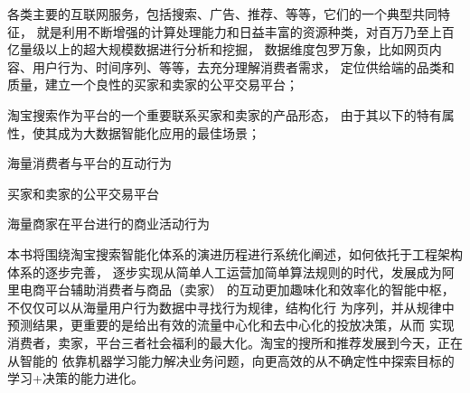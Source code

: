 
 \vspace*{0.0cm}
\thispagestyle{empty}
\vspace*{2.2cm}
\centerline{\hei{\color{darkblue}{内~容~简~介}}}\vspace{2cm}

各类主要的互联网服务，包括搜索、广告、推荐、等等，它们的一个典型共同特征，
就是利用不断增强的计算处理能力和日益丰富的资源种类，对百万乃至上百亿量级以上的超大规模数据进行分析和挖掘，
数据维度包罗万象，比如网页内容、用户行为、时间序列、等等，去充分理解消费者需求，
定位供给端的品类和质量，建立一个良性的买家和卖家的公平交易平台；

淘宝搜索作为平台的一个重要联系买家和卖家的产品形态， 
由于其以下的特有属性，使其成为大数据智能化应用的最佳场景；
\begin{description}
	\item 海量消费者与平台的互动行为
	\item 买家和卖家的公平交易平台
	\item 海量商家在平台进行的商业活动行为
\end{description} 

本书将围绕淘宝搜索智能化体系的演进历程进行系统化阐述，如何依托于工程架构体系的逐步完善，
逐步实现从简单人工运营加简单算法规则的时代，发展成为阿里电商平台辅助消费者与商品（卖家）
的互动更加趣味化和效率化的智能中枢，不仅仅可以从海量用户行为数据中寻找行为规律，结构化行
为序列，并从规律中预测结果，更重要的是给出有效的流量中心化和去中心化的投放决策，从而
实现消费者，卖家，平台三者社会福利的最大化。淘宝的搜所和推荐发展到今天，正在从智能的
依靠机器学习能力解决业务问题，向更高效的从不确定性中探索目标的学习+决策的能力进化。











